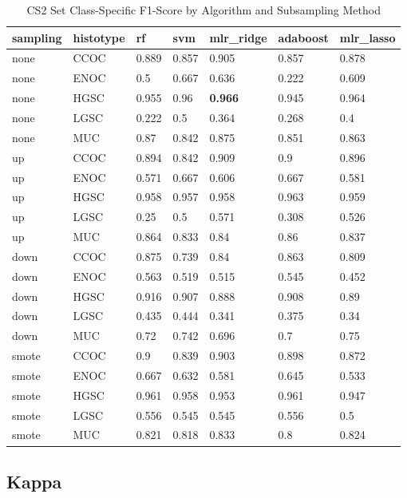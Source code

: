 \documentclass[
]{report}
\begin{document}
\begin{table}

\caption{\label{tab:cs2-f1-class-table}CS2 Set Class-Specific F1-Score by Algorithm and Subsampling Method}
\centering
\begin{tabular}[t]{l|l|l|l|l|l|l}
\hline
sampling & histotype & rf & svm & mlr\_ridge & adaboost & mlr\_lasso\\
\hline
none & CCOC & 0.889 & 0.857 & 0.905 & 0.857 & 0.878\\
\hline
none & ENOC & 0.5 & 0.667 & 0.636 & 0.222 & 0.609\\
\hline
none & HGSC & 0.955 & 0.96 & \textbf{0.966} & 0.945 & 0.964\\
\hline
none & LGSC & 0.222 & 0.5 & 0.364 & 0.268 & 0.4\\
\hline
none & MUC & 0.87 & 0.842 & 0.875 & 0.851 & 0.863\\
\hline
up & CCOC & 0.894 & 0.842 & 0.909 & 0.9 & 0.896\\
\hline
up & ENOC & 0.571 & 0.667 & 0.606 & 0.667 & 0.581\\
\hline
up & HGSC & 0.958 & 0.957 & 0.958 & 0.963 & 0.959\\
\hline
up & LGSC & 0.25 & 0.5 & 0.571 & 0.308 & 0.526\\
\hline
up & MUC & 0.864 & 0.833 & 0.84 & 0.86 & 0.837\\
\hline
down & CCOC & 0.875 & 0.739 & 0.84 & 0.863 & 0.809\\
\hline
down & ENOC & 0.563 & 0.519 & 0.515 & 0.545 & 0.452\\
\hline
down & HGSC & 0.916 & 0.907 & 0.888 & 0.908 & 0.89\\
\hline
down & LGSC & 0.435 & 0.444 & 0.341 & 0.375 & 0.34\\
\hline
down & MUC & 0.72 & 0.742 & 0.696 & 0.7 & 0.75\\
\hline
smote & CCOC & 0.9 & 0.839 & 0.903 & 0.898 & 0.872\\
\hline
smote & ENOC & 0.667 & 0.632 & 0.581 & 0.645 & 0.533\\
\hline
smote & HGSC & 0.961 & 0.958 & 0.953 & 0.961 & 0.947\\
\hline
smote & LGSC & 0.556 & 0.545 & 0.545 & 0.556 & 0.5\\
\hline
smote & MUC & 0.821 & 0.818 & 0.833 & 0.8 & 0.824\\
\hline
\end{tabular}
\end{table}

\hypertarget{kappa-3}{%
\subsection{Kappa}\label{kappa-3}}
\end{document}
